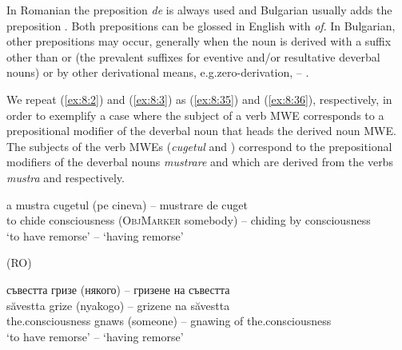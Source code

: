 \documentclass[output=paper]{langsci/langscibook}
\begin{document}
In Romanian the preposition \textit{de} is always used and Bulgarian usually adds
the preposition . Both prepositions can be glossed in English with
\textit{of}. In Bulgarian, other prepositions may occur, generally when the
noun is derived with a suffix other than   or   (the prevalent
suffixes for eventive and/or resultative deverbal nouns) or by other
derivational means, e.g.\@ zero-derivation,  --
. 



We repeat (\ref{ex:8:2}) and (\ref{ex:8:3}) as (\ref{ex:8:35}) and (\ref{ex:8:36}), respectively, in order to
exemplify a case where the subject of a verb MWE corresponds to a
prepositional modifier of the deverbal noun that heads the derived noun
MWE. The subjects of the verb MWEs (\textit{cugetul} and 
)
correspond to the prepositional modifiers of the deverbal nouns
\textit{mustrare} and  which are derived from the verbs \textit{mustra} and
 respectively.



\noindent\begin{minipage}[t]{\linewidth-3em}%
\begin{exe}
\ex \label{ex:8:35}
\settowidth{}
\gll a mustra cugetul (pe cineva) -- mustrare de cuget \\ 
to chide  consciousness  (\textsc{ObjMarker} somebody) – 
chiding by consciousness \\ %
\glt ‘to have remorse’ -- ‘having remorse’
\end{exe}
\end{minipage}%
\hfill
\noindent\begin{minipage}[t]{2em}%
\vspace*{0.15\baselineskip}
(RO)
\end{minipage}

\begin{exe}
\ex \label{ex:8:36}
\settowidth{}
\glll съвестта гризе \textnormal{(}някого\textnormal{)} -- гризене на съвестта\\
săvestta grize (nyakogo) -- grizene na săvestta\\ 
the.consciousness gnaws (someone) --  gnawing of the.consciousness \\
\glt ‘to have remorse’ -- ‘having remorse’
\end{exe}
\end{document}
